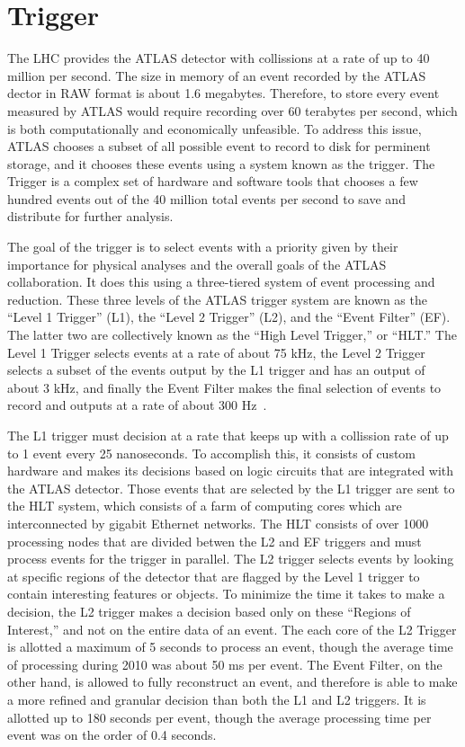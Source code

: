 \section{Trigger}
The LHC provides the ATLAS detector with collissions at a rate of up to 40 million per second.
The size in memory of an event recorded by the ATLAS dector in RAW format is about 1.6 megabytes.
Therefore, to store every event measured by ATLAS would require recording over 60 terabytes
per second, which is both computationally and economically unfeasible.
To address this issue, ATLAS chooses a subset of all possible event to record to disk for
perminent storage, and it chooses these events using a system known as the trigger.
The Trigger is a complex set of hardware and software tools that chooses a few hundred
events out of the 40 million total events per second to save and distribute for further
analysis.

The goal of the trigger is to select events with a priority given by their importance
for physical analyses and the overall goals of the ATLAS collaboration.
It does this using a three-tiered system of event processing and reduction.
These three levels of the ATLAS trigger system are known as the ``Level 1 Trigger'' (L1),
the ``Level 2 Trigger'' (L2), and the ``Event Filter'' (EF).
The latter two are collectively known as the ``High Level Trigger,'' or ``HLT.''
The Level 1 Trigger selects events at a rate of about 75 kHz,
the Level 2 Trigger selects a subset of the events output by the L1 trigger and
has an output of about 3 kHz, and finally the Event Filter makes the final selection
of events to record and outputs at a rate of about 300 Hz~\cite{Aad:2012xs}.

The L1 trigger must decision at a rate that keeps up with a collission rate of
up to 1 event every 25 nanoseconds.
To accomplish this, it consists of custom hardware and makes its decisions based
on logic circuits that are integrated with the ATLAS detector.
Those events that are selected by the L1 trigger are sent to the HLT system, which
consists of a farm of computing cores which are interconnected by gigabit Ethernet
networks.
The HLT consists of over 1000 processing nodes that are divided betwen the L2
and EF triggers and must process events for the trigger in parallel.
The L2 trigger selects events by looking at specific regions of the detector
that are flagged by the Level 1 trigger to contain interesting features
or objects.
To minimize the time it takes to make a decision, the L2 trigger makes a decision
based only on these ``Regions of Interest,'' and not on the entire data of an event.
The each core of the L2 Trigger is allotted a maximum of 5 seconds to process an event,
though the average time of processing during 2010 was about 50 ms per event.
The Event Filter, on the other hand, is allowed to fully reconstruct an event, and
therefore is able to make a more refined and granular decision than both the L1 and L2 triggers.
It is allotted up to 180 seconds per event, though the average processing time per event
was on the order of 0.4 seconds.


